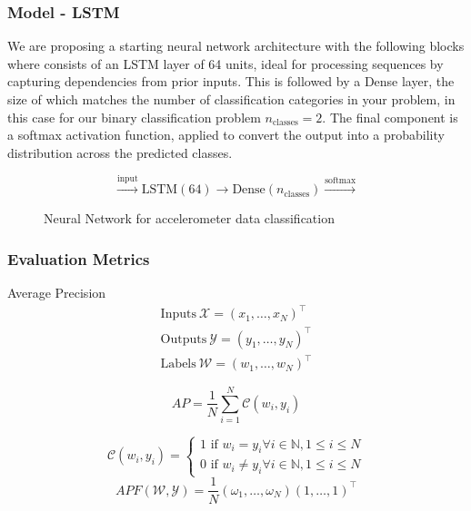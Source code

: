 \documentclass[10pt]{beamer}
\begin{document}
\begin{frame}
  \frametitle{Model - LSTM}
  \begin{block}

        We are proposing a starting neural network architecture with the following blocks where consists of an LSTM layer of 64 units, ideal for processing sequences by capturing dependencies from prior inputs. This is followed by a Dense layer, the size of which matches the number of classification categories in your problem, in this case for our binary classification problem \(n_{\text{classes}} = 2\). The final component is a softmax activation function, applied to convert the output into a probability distribution across the predicted classes. 
        \begin{figure}[h]
          \centering
          \[
          \xrightarrow{\text{input}} \boxed{\text{LSTM} (64)} \rightarrow \boxed{\text{Dense} (n_{\text{classes}})} \xrightarrow{\text{softmax}}
          \]
          \caption{Neural Network for accelerometer data classification}
          \label{fig:neuralnetwork}
        \end{figure}
  \end{block} 
\end{frame}

\begin{frame}
  \frametitle{Evaluation Metrics}
  \begin{block}{Average Precision}
    \begin{gather*}
  \text{Inputs} \ \mathcal{X} = (x_1, \ldots, x_N)^\intercal \\
  \text{Outputs} \ \mathcal{Y} = (y_1, \ldots, y_N)^\intercal \\
  \text{Labels} \ \mathcal{W} = (w_1, \ldots, w_N)^\intercal 
    \end{gather*}

    \begin{equation*}
      AP = \frac{1}{N} \sum_{i=1}^{N}{\mathcal{C}(w_i,y_i)}
    \end{equation*}

    \[
    \mathcal{C}(w_i,y_i) =
    \begin{cases}
      1 \text{ if } w_i = y_i \forall i \in \mathds{N}, 1 \leq i \leq N\\
      0 \text{ if } w_i \neq y_i \forall i \in \mathds{N}, 1 \leq i \leq N
    \end{cases}
    \]
    \begin{equation*}
      APF(\mathcal{W}, \mathcal{Y}) = \frac{1}{N} (\omega_1, \ldots, \omega_N) (1, \ldots, 1)^\intercal
    \end{equation*}
  \end{block} 
\end{frame}
\end{document}
